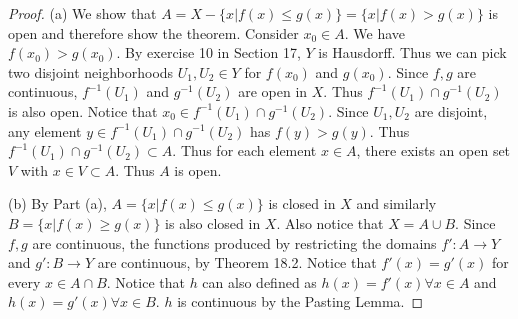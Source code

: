 \documentclass[12pt]{article}
\begin{document}
\begin{proof}
(a) We show that $A = X - \{x | f(x) \leq g(x)\} = \{x | f(x) > g(x)\}$ is open and therefore show the theorem. Consider $x_0 \in A$. We have $f(x_0) > g(x_0)$. By exercise 10 in Section 17, $Y$ is Hausdorff. Thus we can pick two disjoint neighborhoods $U_1, U_2 \in Y$ for $f(x_0)$ and $g(x_0)$. Since $f, g$ are continuous, $f^{-1}(U_1)$ and $g^{-1}(U_2)$ are open in $X$. Thus $f^{-1}(U_1) \cap g^{-1}(U_2)$ is also open. Notice that $x_0 \in f^{-1}(U_1) \cap g^{-1}(U_2)$. Since $U_1, U_2$ are disjoint, any element $y \in f^{-1}(U_1) \cap g^{-1}(U_2)$ has $f(y) > g(y)$. Thus $f^{-1}(U_1) \cap g^{-1}(U_2) \subset A$. Thus for each element $x \in A$, there exists an open set $V$ with $x \in V \subset A$. Thus $A$ is open.

(b) By Part (a), $A = \{x | f(x) \leq g(x)\}$ is closed in $X$ and similarly $B = \{x | f(x) \geq g(x)\}$ is also closed in $X$. Also notice that $X = A \cup B$. Since $f, g$ are continuous, the functions produced by restricting the domains $f': A \rightarrow Y$ and $g': B \rightarrow Y$ are continuous, by Theorem 18.2. Notice that $f'(x) = g'(x)$ for every $x \in A \cap B$. Notice that $h$ can also defined as $h(x) = f'(x) \forall x \in A$ and $h(x) = g'(x) \forall x \in B$. $h$ is continuous by the Pasting Lemma.
\end{proof}
\end{document}
